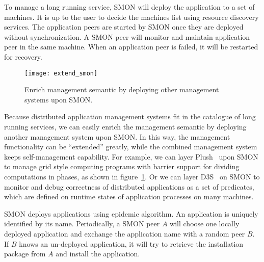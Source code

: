 To manage a long running service, SMON will deploy the
application to a set of machines. It is up to the user to
decide the machines list using resource discovery services.
The application peers are started by SMON once they are
deployed without synchronization. A SMON peer will monitor
and maintain application peer in the same machine. When an
application peer is failed, it will be restarted for
recovery.

\begin{figure}
\centering
\texttt{[image: extend\_smon]}
\caption{Enrich management semantic by deploying other
management systems upon SMON.}
\label{fig:extend_smon}
\end{figure}

Because distributed application management systems fit in
the catalogue of long running services, we can easily enrich
the management semantic by deploying another management
system upon SMON. In this way, the management functionality
can be ``extended'' greatly, while the combined management
system keeps self-management capability. For example, we can
layer Plush~\cite{Albrecht2007} upon SMON to manage grid
style computing programs with barrier support for dividing
computations in phases, as shown in
figure~\ref{fig:extend_smon}. Or we can layer
D3S~\cite{Liu2008} on SMON to monitor and debug correctness
of distributed applications as a set of predicates, which
are defined on runtime states of application processes on
many machines.


SMON deploys applications using epidemic algorithm.  An
application is uniquely identified by its name.
Periodically, a SMON peer $A$ will choose one locally
deployed application and exchange the application name with
a random peer $B$. If $B$ knows an un-deployed application,
it will try to retrieve the installation package from $A$
and install the application.

